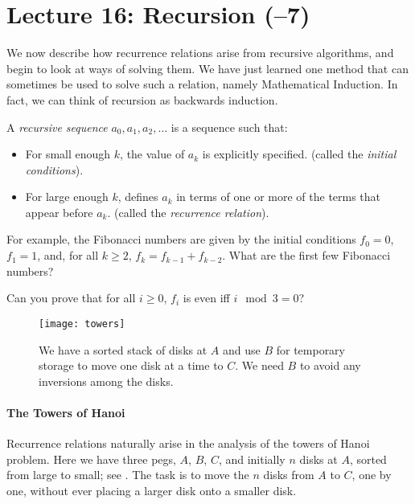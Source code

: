 \section*{Lecture 16: Recursion (--7)}

We now describe how recurrence relations arise from recursive algorithms,
and begin to look at ways of solving them.
We have just learned one method that can sometimes be used to solve
such a relation, namely Mathematical Induction.
In fact, we can think of recursion as backwards induction.

\begin{definition}
    A \emph{recursive sequence} $a_0, a_1, a_2, \ldots$ is a sequence such that:
    \begin{itemize}
        \item For small enough $k$, the value of $a_k$ is explicitly specified.
            (called the \emph{initial conditions}).
        \item For large enough $k$, defines $a_k$ in terms of one or more of the
            terms that appear before $a_k$. (called the \emph{recurrence
            relation}).
    \end{itemize}
\end{definition}

For example, the Fibonacci numbers are given by the initial conditions $f_0=0$,
$f_1=1$, and, for all $k \geq 2$, $f_k=f_{k-1}+f_{k-2}$.  What are the first few
Fibonacci numbers?
\practice

Can you prove that for
all $i \geq 0$, $f_i$ is even iff $i\mod 3 =0$?

\begin{figure}[tbh]
    \centering
    \texttt{[image: towers]}
    \caption{We have a sorted stack of disks at $A$ and use $B$ for temporary
    storage to move one disk at a time to $C$.
    We need $B$ to avoid any inversions among the disks.}
    \label{fig:towers}
\end{figure}
\paragraph{The Towers of Hanoi}
Recurrence relations naturally arise in the analysis of
the towers of Hanoi problem.
Here we have three pegs, $A$, $B$, $C$, and initially $n$
disks at $A$, sorted from large to small;
see .
The task is to move the $n$ disks from $A$ to $C$, one by one,
without ever placing a larger disk onto a smaller disk.

